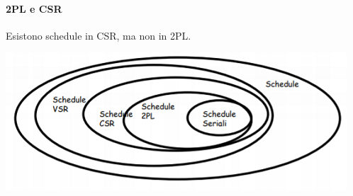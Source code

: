 \paragraph{2PL e CSR} Esistono schedule in CSR, ma non in 2PL.
\begin{center}\includegraphics{images/166.PNG}\end{center}
